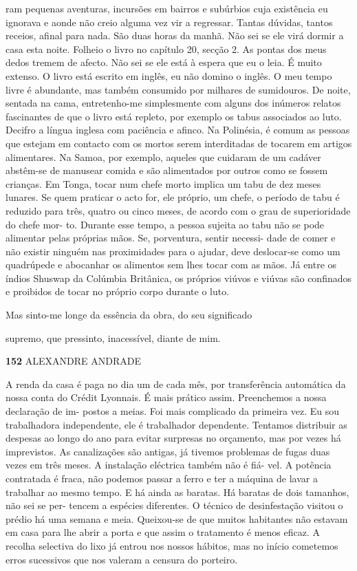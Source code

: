 ram pequenas aventuras, incursões em bairros e subúrbios cuja existência
eu ignorava e aonde não creio alguma vez vir a regressar. Tantas
dúvidas, tantos receios, afinal para nada. São duas horas da manhã. Não
sei se ele virá dormir a casa esta noite. Folheio o livro no capítulo
20, secção 2. As pontas dos meus dedos tremem de afecto. Não sei se ele
está à espera que eu o leia. É muito extenso. O livro está escrito em
inglês, eu não domino o inglês. O meu tempo livre é abundante, mas
também consumido por milhares de sumidouros. De noite, sentada na cama,
entretenho-me simplesmente com alguns dos inúmeros relatos fascinantes
de que o livro está repleto, por exemplo os tabus associados ao luto.
Decifro a língua inglesa com paciência e afinco. Na Polinésia, é comum
as pessoas que estejam em contacto com os mortos serem interditadas de
tocarem em artigos alimentares. Na Samoa, por exemplo, aqueles que
cuidaram de um cadáver abstêm-se de manusear comida e são alimentados
por outros como se fossem crianças. Em Tonga, tocar num chefe morto
implica um tabu de dez meses lunares. Se quem praticar o acto for, ele
próprio, um chefe, o período de tabu é reduzido para três, quatro ou
cinco meses, de acordo com o grau de superioridade do chefe mor- to.
Durante esse tempo, a pessoa sujeita ao tabu não se pode alimentar pelas
próprias mãos. Se, porventura, sentir necessi- dade de comer e não
existir ninguém nas proximidades para o ajudar, deve deslocar-se como um
quadrúpede e abocanhar os alimentos sem lhes tocar com as mãos. Já entre
os índios Shuswap da Colúmbia Britânica, os próprios viúvos e viúvas são
confinados e proibidos de tocar no próprio corpo durante o luto.

Mas sinto-me longe da essência da obra, do seu significado

supremo, que pressinto, inacessível, diante de mim.

\textbf{152 }ALEXANDRE ANDRADE

A renda da casa é paga no dia um de cada mês, por transferência
automática da nossa conta do Crédit Lyonnais. É mais prático assim.
Preenchemos a nossa declaração de im- postos a meias. Foi mais
complicado da primeira vez. Eu sou trabalhadora independente, ele é
trabalhador dependente. Tentamos distribuir as despesas ao longo do ano
para evitar surpresas no orçamento, mas por vezes há imprevistos. As
canalizações são antigas, já tivemos problemas de fugas duas vezes em
três meses. A instalação eléctrica também não é fiá- vel. A potência
contratada é fraca, não podemos passar a ferro e ter a máquina de lavar
a trabalhar ao mesmo tempo. E há ainda as baratas. Há baratas de dois
tamanhos, não sei se per- tencem a espécies diferentes. O técnico de
desinfestação visitou o prédio há uma semana e meia. Queixou-se de que
muitos habitantes não estavam em casa para lhe abrir a porta e que assim
o tratamento é menos eficaz. A recolha selectiva do lixo já entrou nos
nossos hábitos, mas no início cometemos erros sucessivos que nos valeram
a censura do porteiro.

